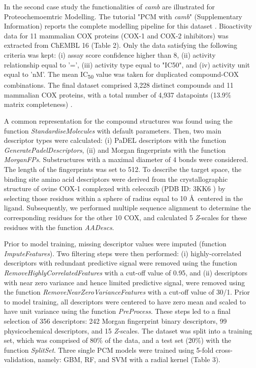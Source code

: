 \documentclass[twoside,a4wide,10pt]{article}
\begin{document}
In the second case study the functionalities of {\it camb} are illustrated for Proteochemoemtric Modelling.
The tutorial "PCM with {\it camb}" (Supplementary Information) reports the complete modelling pipeline for this dataset \cite{cortesCOX}. 
Bioactivity data for 11 mammalian COX proteins (COX-1 and COX-2 inhibitors) was extracted from ChEMBL 16 \citep{chembl, cortesCOX} (Table 2).
Only the data satisfying the following criteria was kept:
(i) assay score confidence higher than 8,
(ii) activity relationship equal to '=',
(iii) activity type equal to "IC50",
and (iv) activity unit equal to 'nM'.
The mean IC\textsubscript{50} value was taken for duplicated compound-COX combinations.
The final dataset comprised 3,228 distinct compounds and 11 mammalian COX proteins,  
with a total number of 4,937 datapoints (13.9\% matrix completeness) \citep{cortesCOX}.

A common representation for the compound structures was found using the function 
{\it StandardiseMolecules} with default parameters.
Then, two main descriptor types were calculated: (i) PaDEL descriptors \citep{padel} with the function {\it GeneratePadelDescriptors},
(ii) and Morgan fingerprints with the function {\it MorganFPs}.
Substructures with a maximal diameter of 4 bonds were considered.
The length of the fingerprints was set to 512.
To describe the target space, the binding site amino acid descriptors were derived
from the crystallographic structure of ovine COX-1 complexed with celecoxib (PDB ID: 3KK6 \citep{pdb_cox})
by selecting those residues within a sphere of radius equal to 10 \AA \ centered in the ligand.
Subsequently, we performed multiple sequence alignment to determine the corresponding 
residues for the other 10 COX, and calculated 5 {\it Z}-scales for these residues with the function {\it AADescs}. 

Prior to model training, missing descriptor values were imputed (function {\it ImputeFeatures}).
Two filtering steps were then performed: (i) highly-correlated descriptors with redundant predictive signal were removed using the function 
{\it RemoveHighlyCorrelatedFeatures} with a cut-off value of 0.95, and (ii) descriptors with near zero variance
and hence limited predictive signal, were removed using the function {\it RemoveNearZeroVarianceFeatures} with a cut-off value of 30/1.
Prior to model training, all descriptors were centered to have zero mean and scaled to have unit variance using the function {\it PreProcess}.
These steps led to a final selection of 356 descriptors: 242 Morgan fingerprint binary descriptors, 
99 physicochemical descriptors, and 15 {\it Z}-scales.
The dataset was split into a training set, which was comprised of 80\% of the data, and a test set (20\%) with the function {\it SplitSet}.
Three single PCM models were trained using 5-fold cross-validation, namely: GBM, RF, and SVM with a radial kernel (Table 3).
\end{document}
